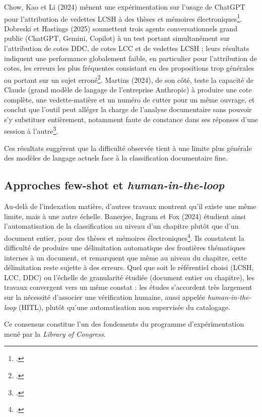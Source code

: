 Chow, Kao et Li (2024) mènent une expérimentation sur l'usage de ChatGPT pour l'attribution de vedettes LCSH à des thèses et mémoires électroniques\footcite{chow2024}. Dobreski et Hastings (2025) soumettent trois agents conversationnels grand public (ChatGPT, Gemini, Copilot) à un test portant simultanément sur l'attribution de cotes DDC, de cotes LCC et de vedettes LCSH ; leurs résultats indiquent une performance globalement faible, en particulier pour l'attribution de cotes, les erreurs les plus fréquentes consistant en des propositions trop générales ou portant sur un sujet erroné\footcite{dobreski2025}. Martins (2024), de son côté, teste la capacité de Claude (grand modèle de langage de l'entreprise Anthropic) à produire une cote complète, une vedette-matière et un numéro de cutter pour un même ouvrage, et conclut que l'outil peut alléger la charge de l'analyse documentaire sans pouvoir s'y substituer entièrement, notamment faute de constance dans ses réponses d'une session à l'autre\footcite{martins2024}.
 
Ces résultats  suggèrent que la difficulté observée tient à une limite plus générale des modèles de langage actuels face à la classification documentaire fine. 


\subsection{Approches few-shot et \textit{human-in-the-loop}}
\label{sec:ia-fewshot-hitl}

Au-delà de l'indexation matière, d'autres travaux montrent qu'il existe une même limite, mais à une autre échelle. Banerjee, Ingram et Fox (2024) étudient ainsi l'automatisation de la classification au niveau d'un chapitre plutôt que d'un document entier, pour des thèses et mémoires électroniques\footcite{banerjee2024}. Ils constatent la difficulté de produire une délimitation automatique des frontières thématiques internes à un document, et remarquent que même au niveau du chapitre, cette délimitation reste sujette à des erreurs. Quel que soit le référentiel choisi (LCSH, LCC, DDC) ou l'échelle de granularité étudiée (document entier ou chapitre), les travaux convergent vers un même constat : les études s'accordent très largement sur la nécessité d'associer une vérification humaine, aussi appelée \textit{human-in-the-loop} (HITL), plutôt qu'une automatisation non supervisée du catalogage.

Ce consensus constitue l'un des fondements du programme d'expérimentation mené par la \textit{Library of Congress}.

